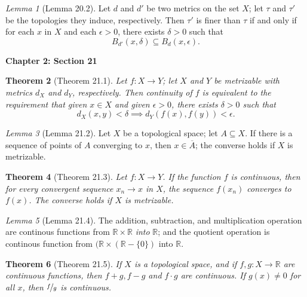 \documentclass{article}
\newtheorem{theorem}{Theorem}
\theoremstyle{definition}
\theoremstyle{remark}
\newtheorem{lemma}[theorem]{Lemma}
\begin{document}
    \begin{lemma}[Lemma 20.2]
        Let $d$ and $d'$ be two metrics on the set $X$; let $\tau$ and $\tau'$ be the topologies they induce, respectively. Then
        $\tau'$ is finer than $\tau$ if and only if for each $x$ in $X$ and each $\epsilon>0$, there exists $\delta>0$ such that
        \[ B_{d'}(x,\delta) \subseteq B_d(x,\epsilon). \]
    \end{lemma}

    \newpage

    \textbf{Chapter 2: Section 21}

    \begin{theorem}[Theorem 21.1]
        Let $f: X\to Y$; let $X$ and $Y$ be metrizable with metrics $d_X$ and $d_Y$, respectively. Then continuity of $f$ is equivalent
        to the requirement that given $x\in X$ and given $\epsilon>0$, there exists $\delta>0$ such that
        \[ d_X(x,y)<\delta \implies d_Y(f(x),f(y)) < \epsilon. \]
    \end{theorem}

    \begin{lemma}[Lemma 21.2]
        Let $X$ be a topological space; let $A\subseteq X$. If there is a sequence of points of $A$ converging to $x$, then
        $x\in\overline{A}$; the converse holds if $X$ is metrizable.
    \end{lemma}

    \begin{theorem}[Theorem 21.3]
        Let $f: X\to Y$. If the function $f$ is continuous, then for every convergent sequence $x_n\to x$ in $X$, the sequence
        $f(x_n)$ converges to $f(x)$. The converse holds if $X$ is metrizable.
    \end{theorem}

    \begin{lemma}[Lemma 21.4]
        The addition, subtraction, and multiplication operation are continous functions from $\mathbb{R}\times\mathbb{R}$ \textit{into}
        $\mathbb{R}$; and the quotient operation is continous function from $(\mathbb{R}\times(\mathbb{R}-\{0\})$ into $\mathbb{R}$.
    \end{lemma}

    \begin{theorem}[Theorem 21.5]
        If $X$ is a topological space, and if $f,g: X\to \mathbb{R}$ are continuous functions, then $f+g,f-g$ and $f\cdot g$ are
        continuous. If $g(x)\neq 0$ for all $x$, then $\nicefrac{f}{g}$ is continuous.
    \end{theorem}
\end{document}
